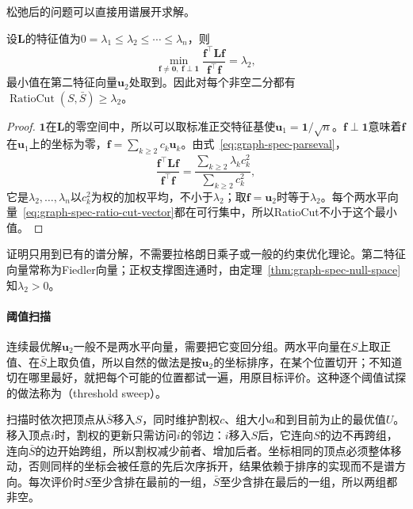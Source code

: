松弛后的问题可以直接用谱展开求解。

\begin{theorem}[RatioCut的谱下界]
\label{thm:graph-spec-ratio-cut-bound}
设$\bm L$的特征值为$0=\lambda_1\leq\lambda_2\leq\cdots\leq\lambda_n$，则
\[
 \min_{\bm f\neq\bm0,\ \bm f\perp\bm1}\frac{\bm f^{\top}\bm L\bm f}{\bm f^{\top}\bm f}=\lambda_2 ,
\]
最小值在第二特征向量$\bm u_2$处取到。因此对每个非空二分都有$\operatorname{RatioCut}(S,\bar S)\geq\lambda_2$。
\end{theorem}

\begin{proof}
$\bm1$在$\bm L$的零空间中，所以可以取标准正交特征基使$\bm u_1=\bm1/\sqrt n$。$\bm f\perp\bm1$意味着$\bm f$在$\bm u_1$上的坐标为零，$\bm f=\sum_{k\geq2}c_k\bm u_k$。由式~\eqref{eq:graph-spec-parseval}，
\[
 \frac{\bm f^{\top}\bm L\bm f}{\bm f^{\top}\bm f}=\frac{\sum_{k\geq2}\lambda_kc_k^2}{\sum_{k\geq2}c_k^2},
\]
它是$\lambda_2,\ldots,\lambda_n$以$c_k^2$为权的加权平均，不小于$\lambda_2$；取$\bm f=\bm u_2$时等于$\lambda_2$。每个两水平向量~\eqref{eq:graph-spec-ratio-cut-vector}都在可行集中，所以RatioCut不小于这个最小值。
\end{proof}

证明只用到已有的谱分解，不需要拉格朗日乘子或一般的约束优化理论。第二特征向量常称为Fiedler向量；正权支撑图连通时，由定理~\ref{thm:graph-spec-null-space}知$\lambda_2>0$。

\paragraph{阈值扫描}
连续最优解$\bm u_2$一般不是两水平向量，需要把它变回分组。两水平向量在$S$上取正值、在$\bar S$上取负值，所以自然的做法是按$\bm u_2$的坐标排序，在某个位置切开；不知道切在哪里最好，就把每个可能的位置都试一遍，用原目标评价。这种逐个阈值试探的做法称为（threshold sweep）。

扫描时依次把顶点从$\bar S$移入$S$，同时维护割权$c$、组大小$a$和到目前为止的最优值$U$。移入顶点$i$时，割权的更新只需访问$i$的邻边：$i$移入$S$后，它连向$S$的边不再跨组，连向$\bar S$的边开始跨组，所以割权减少前者、增加后者。坐标相同的顶点必须整体移动，否则同样的坐标会被任意的先后次序拆开，结果依赖于排序的实现而不是谱方向。每次评价时$S$至少含排在最前的一组，$\bar S$至少含排在最后的一组，所以两组都非空。

